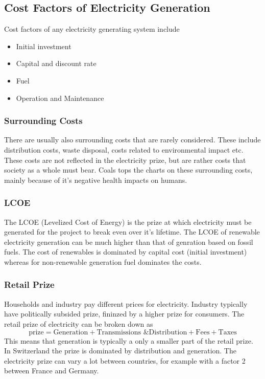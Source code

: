 \subsection{Cost Factors of Electricity Generation}

Cost factors of any electricity generating system include

\begin{itemize}
    \item Initial investment
    \item Capital and discount rate
    \item Fuel
    \item Operation and Maintenance
\end{itemize}

\subsubsection{Surrounding Costs}
There are usually also surrounding costs that are rarely considered. These include distribution costs, waste disposal, costs related to environmental impact etc.
These costs are not reflected in the electricity prize, but are rather costs that society as a whole must bear. Coals tops the charts on these surrounding costs, mainly because of it's negative health impacts on humans.\\

\subsubsection{LCOE}
The LCOE (Levelized Cost of Energy) is the prize at which electricity must be generated for the project to break even over it's lifetime. The LCOE of renewable electricity generation can be much higher than that of genration based on fossil fuels. The cost of renewables is dominated by capital cost (initial investment) whereas for non-renewable generation fuel dominates the costs.

\subsubsection{Retail Prize}
Households and industry pay different prices for electricity. Industry typically have politically subsided prize, fininzed by a higher prize for consumers.
The retail prize of electricity can be broken down as
$$
\text{prize} = \text{Generation} + \text{Transmissions \& Distribution} + \text{Fees} + \text{Taxes}
$$
This means that generation is typically a only a smaller part of the retail prize.
In Switzerland the prize is dominated by distribution and generation. The electricity prize can vary a lot between countries, for example with a factor 2 between France and Germany.

